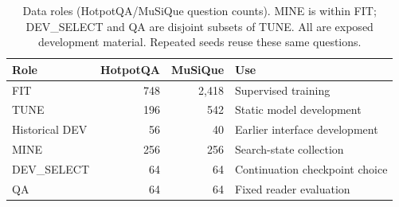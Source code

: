 \begin{table}[t]\centering\small
\caption{Data roles (HotpotQA/MuSiQue question counts). MINE is within FIT;
DEV\_SELECT and QA are disjoint subsets of TUNE. All are exposed development
material. Repeated seeds reuse these same questions.}
\label{tab:roles}
\begin{tabular}{lrrl}\toprule
Role & HotpotQA & MuSiQue & Use\\\midrule
FIT & 748 & 2,418 & Supervised training\\
TUNE & 196 & 542 & Static model development\\
Historical DEV & 56 & 40 & Earlier interface development\\
MINE & 256 & 256 & Search-state collection\\
DEV\_SELECT & 64 & 64 & Continuation checkpoint choice\\
QA & 64 & 64 & Fixed reader evaluation\\\bottomrule
\end{tabular}\end{table}
